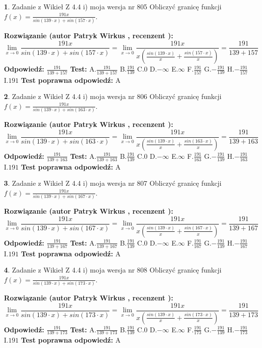 \documentclass[12pt, a4paper]{article}
\theoremstyle{definition} %
\newtheorem{zad}{}
\newcommand{\zadStart}[1]{\begin{zad}#1\newline}
\newcommand{\zadStop}{\end{zad}}
\newcommand{\rozwStart}[2]{\noindent \textbf{Rozwiązanie (autor #1 , recenzent #2): }\newline}
\newcommand{\rozwStop}{\newline}
\newcommand{\odpStart}{\noindent \textbf{Odpowiedź:}\newline}
\newcommand{\odpStop}{\newline}
\newcommand{\testStart}{\noindent \textbf{Test:}\newline}
\newcommand{\testStop}{\newline}
\newcommand{\kluczStart}{\noindent \textbf{Test poprawna odpowiedź:}\newline}
\newcommand{\kluczStop}{\newline}
\begin{document}
\zadStart{Zadanie z Wikieł Z 4.4 i) moja wersja nr 805}
Obliczyć granicę funkcji $f(x)=\frac{191x}{sin(139\cdot x) +sin(157\cdot x)}$.
\zadStop
\rozwStart{Patryk Wirkus}{}
$$\lim\limits_{x\to 0}\frac{191x}{sin(139\cdot x) +sin(157\cdot x)}=\lim\limits_{x\to 0}\frac{191x}{x(\frac{sin(139\cdot x)}{x}+\frac{sin(157\cdot x)}{x})}=\frac{191}{139+157}$$
\rozwStop
\odpStart
$\frac{191}{139+157}$
\odpStop
\testStart
A.$\frac{191}{139+157}$
B.$\frac{191}{139}$
C.$0$
D.$-\infty$
E.$\infty$
F.$\frac{191}{157}$
G.$-\frac{191}{139}$
H.$-\frac{191}{157}$
I.$191$
\testStop
\kluczStart
A
\kluczStop



\zadStart{Zadanie z Wikieł Z 4.4 i) moja wersja nr 806}
Obliczyć granicę funkcji $f(x)=\frac{191x}{sin(139\cdot x) +sin(163\cdot x)}$.
\zadStop
\rozwStart{Patryk Wirkus}{}
$$\lim\limits_{x\to 0}\frac{191x}{sin(139\cdot x) +sin(163\cdot x)}=\lim\limits_{x\to 0}\frac{191x}{x(\frac{sin(139\cdot x)}{x}+\frac{sin(163\cdot x)}{x})}=\frac{191}{139+163}$$
\rozwStop
\odpStart
$\frac{191}{139+163}$
\odpStop
\testStart
A.$\frac{191}{139+163}$
B.$\frac{191}{139}$
C.$0$
D.$-\infty$
E.$\infty$
F.$\frac{191}{163}$
G.$-\frac{191}{139}$
H.$-\frac{191}{163}$
I.$191$
\testStop
\kluczStart
A
\kluczStop



\zadStart{Zadanie z Wikieł Z 4.4 i) moja wersja nr 807}
Obliczyć granicę funkcji $f(x)=\frac{191x}{sin(139\cdot x) +sin(167\cdot x)}$.
\zadStop
\rozwStart{Patryk Wirkus}{}
$$\lim\limits_{x\to 0}\frac{191x}{sin(139\cdot x) +sin(167\cdot x)}=\lim\limits_{x\to 0}\frac{191x}{x(\frac{sin(139\cdot x)}{x}+\frac{sin(167\cdot x)}{x})}=\frac{191}{139+167}$$
\rozwStop
\odpStart
$\frac{191}{139+167}$
\odpStop
\testStart
A.$\frac{191}{139+167}$
B.$\frac{191}{139}$
C.$0$
D.$-\infty$
E.$\infty$
F.$\frac{191}{167}$
G.$-\frac{191}{139}$
H.$-\frac{191}{167}$
I.$191$
\testStop
\kluczStart
A
\kluczStop



\zadStart{Zadanie z Wikieł Z 4.4 i) moja wersja nr 808}
Obliczyć granicę funkcji $f(x)=\frac{191x}{sin(139\cdot x) +sin(173\cdot x)}$.
\zadStop
\rozwStart{Patryk Wirkus}{}
$$\lim\limits_{x\to 0}\frac{191x}{sin(139\cdot x) +sin(173\cdot x)}=\lim\limits_{x\to 0}\frac{191x}{x(\frac{sin(139\cdot x)}{x}+\frac{sin(173\cdot x)}{x})}=\frac{191}{139+173}$$
\rozwStop
\odpStart
$\frac{191}{139+173}$
\odpStop
\testStart
A.$\frac{191}{139+173}$
B.$\frac{191}{139}$
C.$0$
D.$-\infty$
E.$\infty$
F.$\frac{191}{173}$
G.$-\frac{191}{139}$
H.$-\frac{191}{173}$
I.$191$
\testStop
\kluczStart
A
\kluczStop
\end{document}
